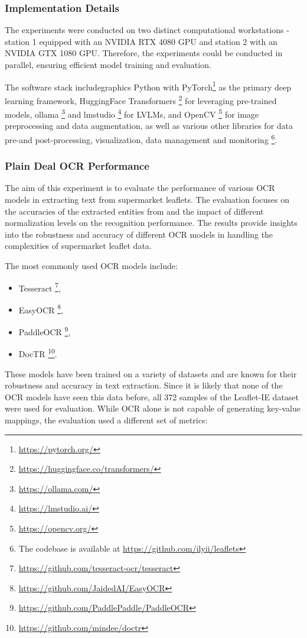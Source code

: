 \documentclass[11pt]{article}
\begin{document}
\subsubsection{Implementation Details}
The experiments were conducted on two distinct computational workstations - station 1 equipped with an NVIDIA RTX 4080 GPU and station 2 with an NVIDIA GTX 1080 GPU. Therefore, the experiments could be conducted in parallel, ensuring efficient model training and evaluation.

The software stack includegraphics Python with PyTorch\footnote{\href{https://pytorch.org/}{https://pytorch.org/}} as the primary deep learning framework, HuggingFace Transformers \footnote{\href{https://huggingface.co/transformers/}{https://huggingface.co/transformers/}}
for leveraging pre-trained models, ollama \footnote{\href{https://ollama.com/}{https://ollama.com/}}
and lmstudio \footnote{\href{https://lmstudio.ai/}{https://lmstudio.ai/}} for LVLMs, and OpenCV \footnote{\href{https://opencv.org/}{https://opencv.org/}} for image preprocessing and data augmentation, as well as various other libraries for data pre-and post-processing, visualization, data management and monitoring \footnote{The codebase is available at \href{https://github.com/ilyii/leaflets}{https://github.com/ilyii/leaflets}}.


\subsubsection{Plain Deal OCR Performance}
The aim of this experiment is to evaluate the performance of various OCR models in extracting text from supermarket leaflets. The evaluation focuses on the accuracies of the extracted entities from  and the impact of different normalization levels on the recognition performance. The results provide insights into the robustness and accuracy of different OCR models in handling the complexities of supermarket leaflet data.

The most commonly used OCR models include:
\begin{itemize}
    \item Tesseract \footnote{\href{https://github.com/tesseract-ocr/tesseract}{https://github.com/tesseract-ocr/tesseract}},
    \item EasyOCR \footnote{\href{https://github.com/JaidedAI/EasyOCR}{https://github.com/JaidedAI/EasyOCR}},
    \item PaddleOCR \footnote{\href{https://github.com/PaddlePaddle/PaddleOCR}{https://github.com/PaddlePaddle/PaddleOCR}},
    \item DocTR \footnote{\href{https://github.com/mindee/doctr}{https://github.com/mindee/doctr}}.
\end{itemize}
These models have been trained on a variety of datasets and are known for their robustness and accuracy in text extraction. Since it is likely that none of the OCR models have seen this data before, all 372 samples of the Leaflet-IE dataset were used for evaluation. While OCR alone is not capable of generating key-value mappings, the evaluation used a different set of metrics:
\end{document}

